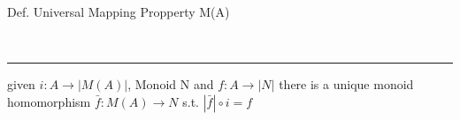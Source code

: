 \begin{note}
  \begin{field}
    Def. Universal Mapping Propperty M(A)
  \end{field} \\
  \noindent\rule[0.5ex]{\linewidth}{1pt}
  \begin{field}
    given $i: A \rightarrow |M(A)|$, Monoid N and $f: A \rightarrow |N|$ there is a unique monoid homomorphism $\bar f: M(A) \rightarrow N$ s.t. $|\bar f|\circ i = f$
  \end{field}
\end{note}














